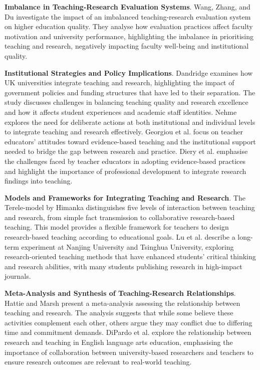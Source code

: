 \documentclass[a4paper, conference]{IEEEtran}
\begin{document}
\textbf{Imbalance in Teaching-Research Evaluation Systems}. Wang, Zhang, and Du \cite{wang2023impact} investigate the impact of an imbalanced teaching-research evaluation system on higher education quality. They analyse how evaluation practices affect faculty motivation and university performance, highlighting the imbalance in prioritising teaching and research, negatively impacting faculty well-being and institutional quality.  

\textbf{Institutional Strategies and Policy Implications}. Dandridge \cite{dandridge2023relationship} examines how UK universities integrate teaching and research, highlighting the impact of government policies and funding structures that have led to their separation. The study discusses challenges in balancing teaching quality and research excellence and how it affects student experiences and academic staff identities. Nehme \cite{nehme2022nexus} explores the need for deliberate actions at both institutional and individual levels to integrate teaching and research effectively. Georgiou et al. \cite{georgiou2023turning} focus on teacher educators' attitudes toward evidence-based teaching and the institutional support needed to bridge the gap between research and practice. Diery et al. \cite{diery2020evidence} emphasise the challenges faced by teacher educators in adopting evidence-based practices and highlight the importance of professional development to integrate research findings into teaching.  

\textbf{Models and Frameworks for Integrating Teaching and Research}. The Terele-model by Himanka \cite{Himanka2024} distinguishes five levels of interaction between teaching and research, from simple fact transmission to collaborative research-based teaching. This model provides a flexible framework for teachers to design research-based teaching according to educational goals. Lu et al. \cite{lu2008experiment} describe a long-term experiment at Nanjing University and Tsinghua University, exploring research-oriented teaching methods that have enhanced students' critical thinking and research abilities, with many students publishing research in high-impact journals.  

\textbf{Meta-Analysis and Synthesis of Teaching-Research Relationships}. Hattie and Marsh \cite{hattie1996relationship} present a meta-analysis assessing the relationship between teaching and research. The analysis suggests that while some believe these activities complement each other, others argue they may conflict due to differing time and commitment demands. DiPardo et al. \cite{DiPardo2006} explore the relationship between research and teaching in English language arts education, emphasising the importance of collaboration between university-based researchers and teachers to ensure research outcomes are relevant to real-world teaching.  
\end{document}
